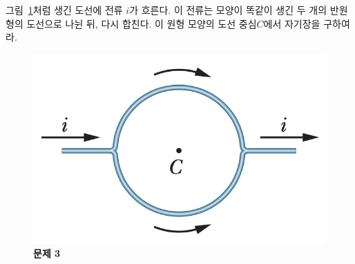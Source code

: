 \documentclass[tightenlines,floatfix,nofootinbib,superscriptaddress,fleqn]{revtex4}
\begin{document}
그림~\ref{fig:3}처럼 생긴 도선에 전류 $i$가 흐른다. 이 전류는 모양이
똑같이 생긴 두 개의 반원형의 도선으로 나뉜 뒤, 다시 합친다. 이 원형
모양의 도선 중심$C$에서 자기장을 구하여라. 
\begin{figure}[htp]
  \centering
  \includegraphics[scale=0.55]{qfig10-1.png}
  \caption{\textbf{문제 3}}
  \label{fig:3}
\end{figure}

\vspace{1cm}
\vspace{1cm}
\end{document}
